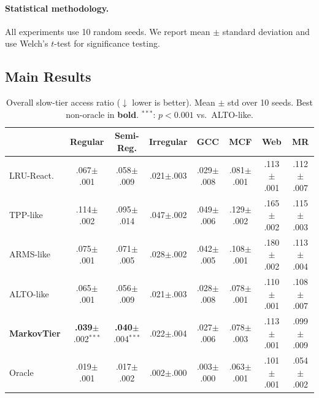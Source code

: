 \documentclass[preprint]{article}
\begin{document}
\paragraph{Statistical methodology.} All experiments use 10 random seeds. We report mean $\pm$ standard deviation and use Welch's $t$-test for significance testing.

\subsection{Main Results}
\label{sec:main_results}

\begin{table}[t]
\caption{Overall slow-tier access ratio ($\downarrow$ lower is better). Mean $\pm$ std over 10 seeds. Best non-oracle in \textbf{bold}. $^{***}$\!: $p < 0.001$ vs.\ ALTO-like.}
\label{tab:main}
\centering
\footnotesize
\setlength{\tabcolsep}{4pt}
\begin{tabular}{@{}lccccccc@{}}
\toprule
 & Regular & Semi-Reg. & Irregular & GCC & MCF & Web & MR \\
\midrule
LRU-React. & .067{\scriptsize$\pm$.001} & .058{\scriptsize$\pm$.009} & .021{\scriptsize$\pm$.003} & .029{\scriptsize$\pm$.008} & .081{\scriptsize$\pm$.001} & .113{\scriptsize$\pm$.001} & .112{\scriptsize$\pm$.007} \\
TPP-like & .114{\scriptsize$\pm$.002} & .095{\scriptsize$\pm$.014} & .047{\scriptsize$\pm$.002} & .049{\scriptsize$\pm$.006} & .129{\scriptsize$\pm$.002} & .165{\scriptsize$\pm$.002} & .115{\scriptsize$\pm$.003} \\
ARMS-like & .075{\scriptsize$\pm$.001} & .071{\scriptsize$\pm$.005} & .028{\scriptsize$\pm$.002} & .042{\scriptsize$\pm$.005} & .108{\scriptsize$\pm$.001} & .180{\scriptsize$\pm$.002} & .113{\scriptsize$\pm$.004} \\
ALTO-like & .065{\scriptsize$\pm$.001} & .056{\scriptsize$\pm$.009} & .021{\scriptsize$\pm$.003} & .028{\scriptsize$\pm$.008} & .078{\scriptsize$\pm$.001} & .110{\scriptsize$\pm$.001} & .108{\scriptsize$\pm$.007} \\
\textbf{MarkovTier} & \textbf{.039}{\scriptsize$\pm$.002}$^{***}$ & \textbf{.040}{\scriptsize$\pm$.004}$^{***}$ & .022{\scriptsize$\pm$.004} & .027{\scriptsize$\pm$.006} & .078{\scriptsize$\pm$.003} & .113{\scriptsize$\pm$.001} & .099{\scriptsize$\pm$.009} \\
Oracle & .019{\scriptsize$\pm$.001} & .017{\scriptsize$\pm$.002} & .002{\scriptsize$\pm$.000} & .003{\scriptsize$\pm$.000} & .063{\scriptsize$\pm$.001} & .101{\scriptsize$\pm$.001} & .054{\scriptsize$\pm$.002} \\
\bottomrule
\end{tabular}
\end{table}
\end{document}
